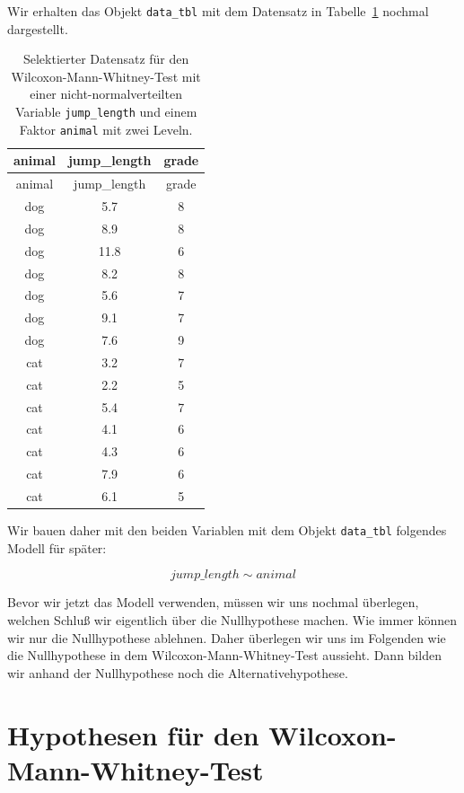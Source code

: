 \documentclass[
  letterpaper,
]{scrbook}
\begin{document}
Wir erhalten das Objekt \texttt{data\_tbl} mit dem Datensatz in
Tabelle~\ref{tbl-data-utest-1} nochmal dargestellt.

\hypertarget{tbl-data-utest-1}{}
\begin{longtable}[]{@{}ccc@{}}
\caption{\label{tbl-data-utest-1}Selektierter Datensatz für den
Wilcoxon-Mann-Whitney-Test mit einer nicht-normalverteilten Variable
\texttt{jump\_length} und einem Faktor \texttt{animal} mit zwei
Leveln.}\tabularnewline
\toprule()
animal & jump\_length & grade \\
\midrule()
\endfirsthead
\toprule()
animal & jump\_length & grade \\
\midrule()
\endhead
dog & 5.7 & 8 \\
dog & 8.9 & 8 \\
dog & 11.8 & 6 \\
dog & 8.2 & 8 \\
dog & 5.6 & 7 \\
dog & 9.1 & 7 \\
dog & 7.6 & 9 \\
cat & 3.2 & 7 \\
cat & 2.2 & 5 \\
cat & 5.4 & 7 \\
cat & 4.1 & 6 \\
cat & 4.3 & 6 \\
cat & 7.9 & 6 \\
cat & 6.1 & 5 \\
\bottomrule()
\end{longtable}

Wir bauen daher mit den beiden Variablen mit dem Objekt
\texttt{data\_tbl} folgendes Modell für später:

\[
jump\_length \sim animal
\]

Bevor wir jetzt das Modell verwenden, müssen wir uns nochmal überlegen,
welchen Schluß wir eigentlich über die Nullhypothese machen. Wie immer
können wir nur die Nullhypothese ablehnen. Daher überlegen wir uns im
Folgenden wie die Nullhypothese in dem Wilcoxon-Mann-Whitney-Test
aussieht. Dann bilden wir anhand der Nullhypothese noch die
Alternativehypothese.

\hypertarget{hypothesen-fuxfcr-den-wilcoxon-mann-whitney-test}{%
\section{Hypothesen für den
Wilcoxon-Mann-Whitney-Test}\label{hypothesen-fuxfcr-den-wilcoxon-mann-whitney-test}}
\end{document}
